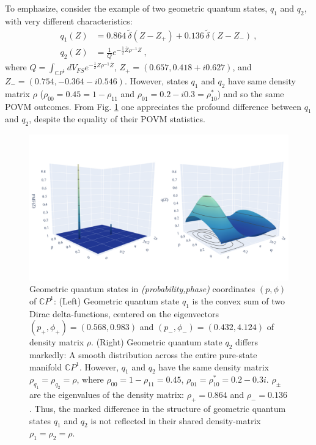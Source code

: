 \documentclass[draft,nofootinbib,pre,twocolumn,showpacs,showkeys,preprintnumbers,floatfix]{revtex4-1}
\newcommand{\1}{\mathbbm{1}}
\begin{document}
To emphasize, consider the example of two geometric quantum states, $q_1$ and
$q_2$, with very different characteristics:
\begin{align*}
q_1(Z) & = 0.864~\tilde{\delta}(Z - Z_{+}) + 0.136~\tilde{\delta}(Z - Z_{-})~,\\
q_2(Z) & = \frac{1}{Q} e^{-\frac{1}{2} \overline{Z}\rho^{-1}Z } 
  ~,
\end{align*}
where $Q = \int_{\mathbb{C}P^1} dV_{FS} e^{-\frac{1}{2}Z \rho^{-1}
\overline{Z}}$, $Z_+ = (0.657,0.418 + i 0.627)$, and $Z_- =
(0.754,-0.364-i0.546)$. However, states $q_1$ and $q_2$ have same density
matrix $\rho$ ($\rho_{00} = 0.45 = 1- \rho_{11}$ and $\rho_{01} = 0.2 - i 0.3
= \rho_{10}^{*}$) and so the same POVM outcomes. From Fig. \ref{fig:Example}
one appreciates the profound difference between $q_1$ and $q_2$, despite the
equality of their POVM statistics.

\begin{figure}[h]
\centering
\includegraphics[width=\columnwidth]{img/New_Example.pdf}
\caption{Geometric quantum states in \emph{(probability,phase)} coordinates
	$(p,\phi)$ of $\mathbb{C}P^1$: (Left) Geometric quantum state $q_1$ is the
	convex sum of two Dirac delta-functions, centered on the eigenvectors
	$(p_+,\phi_+) = (0.568,0.983) $ and $(p_-, \phi_-) = (0.432,4.124)$ of
	density matrix $\rho$. (Right) Geometric quantum state $q_2$ differs
	markedly: A smooth distribution across the entire pure-state manifold
	$\mathbb{C}P^1$. However, $q_1$ and $q_2$ have the same density matrix
	$\rho_{q_1} = \rho_{q_2} = \rho$, where $\rho_{00} = 1- \rho_{11} = 0.45$,
	$\rho_{01} = \rho_{10}^{*} = 0.2 - 0.3 i$. $\rho_{\pm}$ are the eigenvalues
	of the density matrix: $\rho_+ = 0.864$ and $\rho_{-}=0.136$. Thus, the
	marked difference in the structure of geometric quantum states $q_1$ and
	$q_2$ is not reflected in their shared density-matrix $\rho_1 = \rho_2 =
	\rho$.
	}
\label{fig:Example} 
\end{figure}
\end{document}
